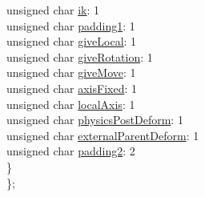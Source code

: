 \begin{DoxyCompactItemize}
\begin{tabbing}
\>\>unsigned char \mbox{\hyperlink{struct_p_m_x_1_1_bone_data_ac0edf599b7cd52c4d687e2f3c8a7b693}{ik}}: 1\\
\>\>unsigned char \mbox{\hyperlink{struct_p_m_x_1_1_bone_data_acdfb8797194ff199336ed541d9183e30}{padding1}}: 1\\
\>\>unsigned char \mbox{\hyperlink{struct_p_m_x_1_1_bone_data_a235200bc71e598f3e8f98f08fc031008}{giveLocal}}: 1\\
\>\>unsigned char \mbox{\hyperlink{struct_p_m_x_1_1_bone_data_aea7b93c33710b793aada74cbc3a69106}{giveRotation}}: 1\\
\>\>unsigned char \mbox{\hyperlink{struct_p_m_x_1_1_bone_data_a650c02798ac35c067296d86438be6175}{giveMove}}: 1\\
\>\>unsigned char \mbox{\hyperlink{struct_p_m_x_1_1_bone_data_a693a2055e095583e9e573845f4094970}{axisFixed}}: 1\\
\>\>unsigned char \mbox{\hyperlink{struct_p_m_x_1_1_bone_data_ab58bc30c733c444a04d28df700124438}{localAxis}}: 1\\
\>\>unsigned char \mbox{\hyperlink{struct_p_m_x_1_1_bone_data_a04d6dbb72f8be398cb857ff6bd1024e1}{physicsPostDeform}}: 1\\
\>\>unsigned char \mbox{\hyperlink{struct_p_m_x_1_1_bone_data_afbb20d21baab577ef134cc623a7da34f}{externalParentDeform}}: 1\\
\>\>unsigned char \mbox{\hyperlink{struct_p_m_x_1_1_bone_data_abb6c53fa5a0c8057551532f595d8c367}{padding2}}: 2\\
\>\} \\
\}; \\


\end{tabbing}
\end{DoxyCompactItemize}
